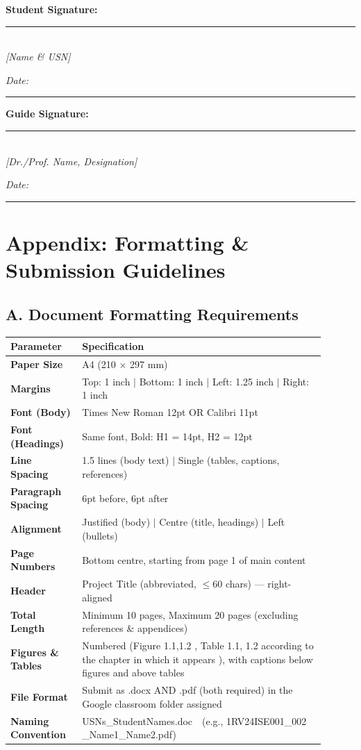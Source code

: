 \documentclass[12pt,a4paper]{article}
\newcommand{\redsec}[1]{\section*{\color{dred}#1}\vspace{-4pt}}
\newcommand{\dredrule}{\noindent{\color{dred}\rule{\linewidth}{0.5pt}}\par\vspace{4pt}}
\newcommand{\navysub}[1]{\subsection*{\color{navy}#1}}
\begin{document}
\vspace{6pt}
\noindent\begin{minipage}[t]{0.5\linewidth}
\textbf{Student Signature:}\\[1.1cm]
\rule{0.93\linewidth}{0.5pt}\\[-2pt]
{\itshape\small\color{gtext}[Name \& USN]}\\
{\itshape\small\color{gtext}Date: \rule[-2pt]{3.4cm}{0.4pt}}
\end{minipage}%
\vrule\hspace{8pt}%
\begin{minipage}[t]{0.46\linewidth}
\textbf{Guide Signature:}\\[1.1cm]
\rule{\linewidth}{0.5pt}\\[-2pt]
{\itshape\small\color{gtext}[Dr./Prof. Name, Designation]}\\
{\itshape\small\color{gtext}Date: \rule[-2pt]{3.4cm}{0.4pt}}
\end{minipage}

\newpage
\redsec{Appendix: Formatting \& Submission Guidelines}
\dredrule
\bigskip
\navysub{A. Document Formatting Requirements}
\renewcommand{\arraystretch}{1.3}
\begin{longtable}{|>{\raggedright\arraybackslash\setlength{\parskip}{0pt}\setstretch{1}\bfseries\small}p{0.2\linewidth}|>{\raggedright\arraybackslash\setlength{\parskip}{0pt}\setstretch{1}\small}p{0.7\linewidth}|}
\hline
\rowcolor{ghead}\bfseries Parameter & \bfseries Specification \\ \hline
Paper Size & A4 (210 $\times$ 297 mm) \\ \hline
Margins & Top: 1 inch $|$ Bottom: 1 inch $|$ Left: 1.25 inch $|$ Right: 1 inch \\ \hline
Font (Body) & Times New Roman 12pt OR Calibri 11pt \\ \hline
Font (Headings) & Same font, Bold: H1 = 14pt, H2 = 12pt \\ \hline
Line Spacing & 1.5 lines (body text) $|$ Single (tables, captions, references) \\ \hline
Paragraph Spacing & 6pt before, 6pt after \\ \hline
Alignment & Justified (body) $|$ Centre (title, headings) $|$ Left (bullets) \\ \hline
Page Numbers & Bottom centre, starting from page 1 of main content \\ \hline
Header & Project Title (abbreviated, $\leq$60 chars) --- right-aligned \\ \hline
Total Length & Minimum 10 pages, Maximum 20 pages (excluding references \& appendices) \\ \hline
Figures \& Tables & Numbered (Figure 1.1,1.2 , Table 1.1, 1.2 according to the chapter in which it appears ), with captions below figures and above tables \\ \hline
File Format & Submit as .docx AND .pdf (both required) in the Google classroom folder assigned \\ \hline
Naming Convention & USNs\_StudentNames.doc\ \ (e.g., 1RV24ISE001\_002 \_Name1\_Name2.pdf) \\ \hline
\end{longtable}
\end{document}
